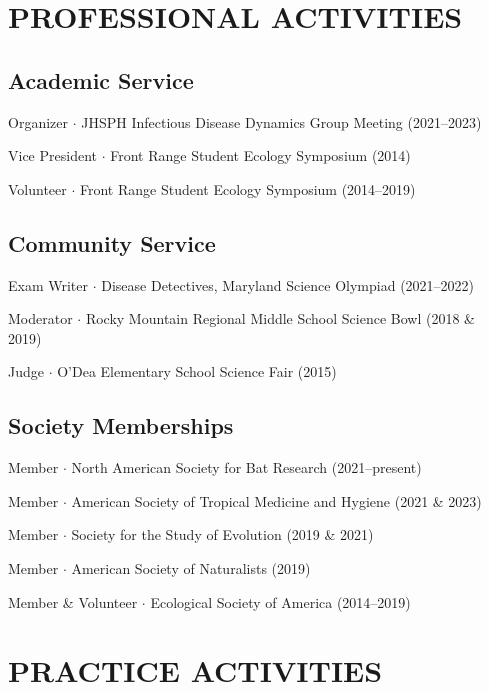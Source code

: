 \documentclass{cv}
\begin{document}
\section*{PROFESSIONAL ACTIVITIES}

\subsection*{Academic Service}

Organizer $\cdot$ JHSPH Infectious Disease Dynamics Group Meeting (2021--2023)

Vice President $\cdot$ Front Range Student Ecology Symposium (2014)

Volunteer  $\cdot$ Front Range Student Ecology Symposium (2014--2019)

\subsection*{Community Service}

Exam Writer $\cdot$ Disease Detectives, Maryland Science Olympiad (2021--2022)

Moderator $\cdot$ Rocky Mountain Regional Middle School Science Bowl (2018 \& 2019)

Judge $\cdot$ O'Dea Elementary School Science Fair (2015)

\subsection*{Society Memberships}

Member $\cdot$ North American Society for Bat Research (2021--present)

Member $\cdot$ American Society of Tropical Medicine and Hygiene (2021 \& 2023)

Member $\cdot$ Society for the Study of Evolution (2019 \& 2021)

Member $\cdot$ American Society of Naturalists (2019)

Member \& Volunteer $\cdot$ Ecological Society of America (2014--2019)


\section*{PRACTICE ACTIVITIES}
\end{document}
